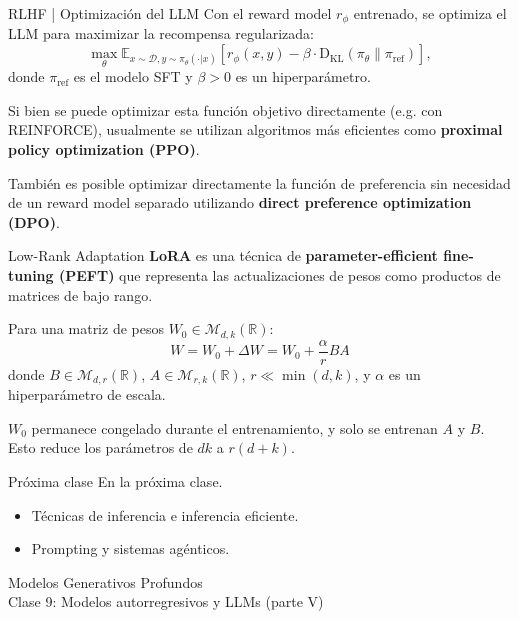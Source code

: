 \documentclass{beamer}
\newcommand{\R}{\mathbb{R}}
\begin{document}
\begin{frame}{RLHF | Optimización del LLM}
    Con el reward model $r_\phi$ entrenado, se optimiza el LLM para maximizar la recompensa regularizada:
    \begin{equation*}
        \max_\theta \mathbb{E}_{x \sim \mathcal{D}, y \sim \pi_\theta(\cdot|x)} \left[r_\phi(x, y) - \beta \cdot \operatorname{D_{KL}}(\pi_\theta \| \pi_{\text{ref}})\right],
    \end{equation*}
    donde $\pi_{\text{ref}}$ es el modelo SFT y $\beta > 0$ es un hiperparámetro.

    Si bien se puede optimizar esta función objetivo directamente (e.g. con REINFORCE), usualmente se utilizan algoritmos más eficientes como \textbf{proximal policy optimization (PPO)}.

    También es posible optimizar directamente la función de preferencia sin necesidad de un reward model separado utilizando \textbf{direct preference optimization (DPO)}.
\end{frame}

\begin{frame}{Low-Rank Adaptation}
    \textbf{LoRA} es una técnica de \textbf{parameter-efficient fine-tuning (PEFT)} que representa las actualizaciones de pesos como productos de matrices de bajo rango.

    Para una matriz de pesos $W_0 \in \mathcal{M}_{d,k}(\R)$:
    \begin{equation*}
        W = W_0 + \Delta W = W_0 + \frac{\alpha}{r} BA
    \end{equation*}
    donde $B \in \mathcal{M}_{d,r}(\R)$, $A \in \mathcal{M}_{r,k}(\R)$, $r \ll \min(d, k)$, y $\alpha$ es un hiperparámetro de escala.

    $W_0$ permanece congelado durante el entrenamiento, y solo se entrenan $A$ y $B$. Esto reduce los parámetros de $dk$ a $r(d+k)$.
\end{frame}

\begin{frame}{Próxima clase}
    En la próxima clase.
    \begin{itemize}
        \item Técnicas de inferencia e inferencia eficiente.
        \item Prompting y sistemas agénticos.
    \end{itemize}
\end{frame}

\begin{frame}
    \centering
    \Large{Modelos Generativos Profundos}\\
    \large{Clase 9: Modelos autorregresivos y LLMs (parte V)}
\end{frame}
\end{document}
